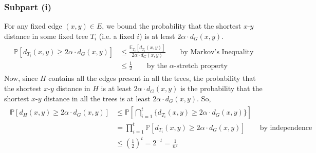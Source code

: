 \documentclass[9pt]{article}
\begin{document}
\subsubsection*{Subpart (i)}
For any fixed edge $(x, y) \in E$, we bound the probability that the shortest $x$-$y$ distance
in some fixed tree $T_{i}$ (i.e. a fixed $i$) is at least $2 \alpha \cdot d_{G}(x, y)$.
\begin{align}
    \begin{split}
        \mathbb{P}[d_{T_{i}}(x, y) \geq 2 \alpha \cdot d_{G}(x, y)]
        &\leq \frac{\mathbb{E}_{T_{i}}[d_{T_{i}}(x, y)]}{2 \alpha \cdot d_{G}(x, y)} \qquad \text{by Markov's Inequality} \\
        &\leq \frac{1}{2} \qquad \text{by the $\alpha$-stretch property}
    \end{split}
\end{align}
Now, since $H$ contains all the edges present in all the trees, the probability that the shortest
$x$-$y$ distance in $H$ is at least $2 \alpha \cdot d_{G}(x, y)$ is the probability that the
shortest $x$-$y$ distance in all the trees is at least $2 \alpha \cdot d_{G}(x, y)$. So,
\begin{align}
    \begin{split}
        \mathbb{P}[d_{H}(x, y) \geq 2 \alpha \cdot d_{G}(x, y)]
        &\leq \mathbb{P} \left[ \bigcap_{i=1}^{t} \{ d_{T_{i}}(x, y) \geq 2 \alpha \cdot d_{G}(x, y) \} \right] \\
        &= \prod_{i=1}^{t} \mathbb{P}[d_{T_{i}}(x, y) \geq 2 \alpha \cdot d_{G}(x, y)] \qquad \text{by independence} \\
        &\leq \left( \frac{1}{2} \right)^{t} = 2^{-t} = \frac{1}{n^{4}}
    \end{split}
\end{align}
\end{document}
